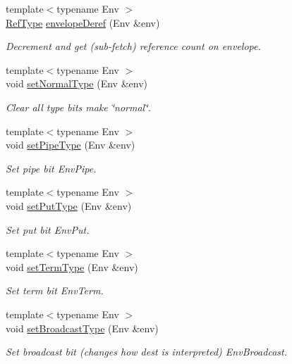 \begin{DoxyCompactItemize}
{\footnotesize template$<$typename Env $>$ }\\\hyperlink{namespacevt_a9b39ce9494bb04674d0d5b895a5aa50f}{Ref\+Type} \hyperlink{namespacevt_a6083c0bb47b5d180acb1f32542833e67}{envelope\+Deref} (Env \&env)
\begin{DoxyCompactList}\small\item\em Decrement and get (sub-\/fetch) reference count on envelope. \end{DoxyCompactList}\item 
{\footnotesize template$<$typename Env $>$ }\\void \hyperlink{namespacevt_aa76e59d48d53aa1e4c60bd55ff520d6a}{set\+Normal\+Type} (Env \&env)
\begin{DoxyCompactList}\small\item\em Clear all type bits make \char`\"{}normal\char`\"{}. \end{DoxyCompactList}\item 
{\footnotesize template$<$typename Env $>$ }\\void \hyperlink{namespacevt_a4ecba7a91cd1d5a6b6473cbac2042c2b}{set\+Pipe\+Type} (Env \&env)
\begin{DoxyCompactList}\small\item\em Set pipe bit {\ttfamily Env\+Pipe}. \end{DoxyCompactList}\item 
{\footnotesize template$<$typename Env $>$ }\\void \hyperlink{namespacevt_ab25ac0a12270d261c2f5c3c634f6370e}{set\+Put\+Type} (Env \&env)
\begin{DoxyCompactList}\small\item\em Set put bit {\ttfamily Env\+Put}. \end{DoxyCompactList}\item 
{\footnotesize template$<$typename Env $>$ }\\void \hyperlink{namespacevt_aa42d7e0adc8b283dd10602ece422699d}{set\+Term\+Type} (Env \&env)
\begin{DoxyCompactList}\small\item\em Set term bit {\ttfamily Env\+Term}. \end{DoxyCompactList}\item 
{\footnotesize template$<$typename Env $>$ }\\void \hyperlink{namespacevt_a09c45bbc6f806667b35402f2dac3d32d}{set\+Broadcast\+Type} (Env \&env)
\begin{DoxyCompactList}\small\item\em Set broadcast bit (changes how {\ttfamily dest} is interpreted) {\ttfamily Env\+Broadcast}. \end{DoxyCompactList}\item 

\end{DoxyCompactItemize}
